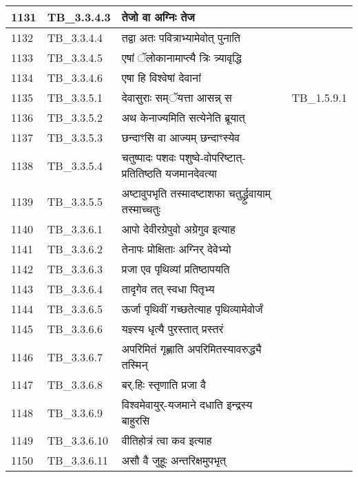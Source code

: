 \documentclass[17pt]{extarticle}
\begin{document}
\begin{longtable}{||p{0.4in}||p{0.9in}||p{4.0in}||p{0.9in}||}
        \hline
            1131 & TB\_3.3.4.3 & तेजो वा अग्निः तेज &      \\
        \hline
            1132 & TB\_3.3.4.4 & तद्वा अतः पवित्राभ्यामेवोत् पुनाति &      \\
        \hline
            1133 & TB\_3.3.4.5 & एषां ॅलोकानामाप्त्यै त्रिः त्र्यावृद्धि &      \\
        \hline
            1134 & TB\_3.3.4.6 & एषा हि विश्वेषां देवानां &      \\
        \hline
            1135 & TB\_3.3.5.1 & देवासुराः सम्ॅयत्ता आसन्न् स & TB\_1.5.9.1        \\
        \hline
            1136 & TB\_3.3.5.2 & अथ केनाज्यमिति सत्येनेति ब्रूयात् &      \\
        \hline
            1137 & TB\_3.3.5.3 & छन्दाꣳसि वा आज्यम् छन्दाꣳस्येव &      \\
        \hline
            1138 & TB\_3.3.5.4 & चतुष्पादः पशवः पशुष्वे{-}वोपरिष्टात्{-}प्रतितिष्ठति यजमानदेवत्या &      \\
        \hline
            1139 & TB\_3.3.5.5 & अष्टावुपभृति तस्मादष्टाशफा चतुर्द्ध्रुवायाम् तस्माच्चतुः &      \\
        \hline
            1140 & TB\_3.3.6.1 & आपो देवीरग्रेपुवो अग्रेगुव इत्याह &      \\
        \hline
            1141 & TB\_3.3.6.2 & तेनापः प्रोक्षिताः अग्निर् देवेभ्यो &      \\
        \hline
            1142 & TB\_3.3.6.3 & प्रजा एव पृथिव्यां प्रतिष्ठापयति &      \\
        \hline
            1143 & TB\_3.3.6.4 & तादृगेव तत् स्वधा पितृभ्य &      \\
        \hline
            1144 & TB\_3.3.6.5 & ऊर्जा पृथिवीं गच्छतेत्याह पृथिव्यामेवोर्जं &      \\
        \hline
            1145 & TB\_3.3.6.6 & यज्ञ्स्य धृत्यै पुरस्तात् प्रस्तरं &      \\
        \hline
            1146 & TB\_3.3.6.7 & अपरिमितं गृह्णाति अपरिमितस्यावरुद्ध्यै तस्मिन् &      \\
        \hline
            1147 & TB\_3.3.6.8 & बर्.हिः स्तृणाति प्रजा वै &      \\
        \hline
            1148 & TB\_3.3.6.9 & विश्वमेवायुर्{-}यजमाने दधाति इन्द्रस्य बाहुरसि &      \\
        \hline
            1149 & TB\_3.3.6.10 & वीतिहोत्रं त्वा कव इत्याह &      \\
        \hline
            1150 & TB\_3.3.6.11 & असौ वै जुहूः अन्तरिक्षमुपभृत् &      \\

\end{longtable}
\end{document}
